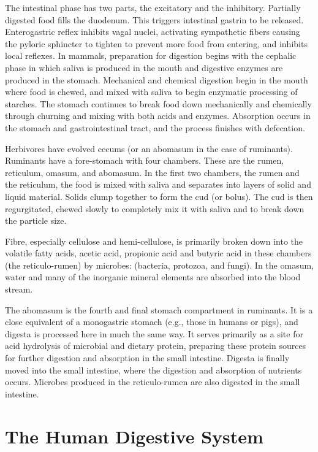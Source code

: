 The intestinal phase has two parts, the excitatory and the inhibitory. Partially digested food fills the duodenum. This triggers intestinal gastrin to be released. Enterogastric reflex inhibits vagal nuclei, activating sympathetic fibers causing the pyloric sphincter to tighten to prevent more food from entering, and inhibits local reflexes.
In mammals, preparation for digestion begins with the cephalic phase in which saliva is produced in the mouth and digestive enzymes are produced in the stomach. Mechanical and chemical digestion begin in the mouth where food is chewed, and mixed with saliva to begin enzymatic processing of starches. The stomach continues to break food down mechanically and chemically through churning and mixing with both acids and enzymes. Absorption occurs in the stomach and gastrointestinal tract, and the process finishes with defecation.

Herbivores have evolved cecums (or an abomasum in the case of ruminants). Ruminants have a fore-stomach with four chambers. These are the rumen, reticulum, omasum, and abomasum. In the first two chambers, the rumen and the reticulum, the food is mixed with saliva and separates into layers of solid and liquid material. Solids clump together to form the cud (or bolus). The cud is then regurgitated, chewed slowly to completely mix it with saliva and to break down the particle size.

Fibre, especially cellulose and hemi-cellulose, is primarily broken down into the volatile fatty acids, acetic acid, propionic acid and butyric acid in these chambers (the reticulo-rumen) by microbes: (bacteria, protozoa, and fungi). In the omasum, water and many of the inorganic mineral elements are absorbed into the blood stream.

The abomasum is the fourth and final stomach compartment in ruminants. It is a close equivalent of a monogastric stomach (e.g., those in humans or pigs), and digesta is processed here in much the same way. It serves primarily as a site for acid hydrolysis of microbial and dietary protein, preparing these protein sources for further digestion and absorption in the small intestine. Digesta is finally moved into the small intestine, where the digestion and absorption of nutrients occurs. Microbes produced in the reticulo-rumen are also digested in the small intestine.

\hypertarget{the-human-digestive-system}{%
\section{The Human Digestive System}\label{the-human-digestive-system}}

